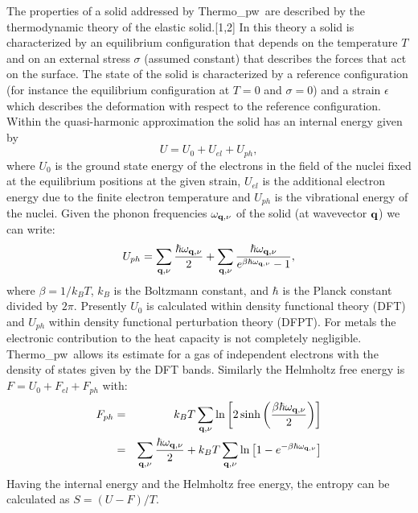 \documentclass[12pt,a4paper,twoside]{report}
\def\tpw{{\sc Thermo}\_{\sc pw}}
\begin{document}
The properties of a solid addressed by \tpw\ are described by the thermodynamic
theory of the elastic solid.[1,2] In this theory a solid is characterized by an
equilibrium configuration that depends on the temperature $T$ and on an
external stress $\sigma$ (assumed constant) that describes the forces 
that act on the surface. The state
of the solid is characterized by a reference configuration 
(for instance the equilibrium configuration at $T=0$ and $\sigma=0$) and 
a strain $\epsilon$ which describes the deformation with respect to the 
reference configuration. 
Within the quasi-harmonic approximation the solid has an internal
energy given by  
\begin{equation}
U=U_0 + U_{el} + U_{ph},
\end{equation}
where $U_0$ is the ground state energy of the electrons in the field 
of the nuclei fixed at the equilibrium positions at the given strain, 
$U_{el}$ is the additional electron energy due to the 
finite electron temperature and $U_{ph}$ is the vibrational energy of the nuclei. 
Given the phonon frequencies $\omega_{{\bf q},\nu}$ of the solid 
(at wavevector ${\bf q}$) we can write:
\begin{equation}
U_{ph} = \sum_{{\bf q},\nu} {\hbar \omega_{{\bf q},\nu} \over 2}
+ \sum_{{\bf q},\nu} {\hbar \omega_{{\bf q},\nu} \over 
e^{\beta \hbar \omega_{{\bf q},\nu}}-1},
\label{uvib}
\end{equation}
where $\beta=1/ k_B T$, $k_B$ is the Boltzmann constant, and $\hbar$ is the
Planck constant divided by $2\pi$.
Presently $U_0$ is calculated within density functional theory (DFT) and
$U_{ph}$ within density functional perturbation theory (DFPT). 
For metals the electronic contribution to the heat capacity is not 
completely negligible. \tpw\ allows its estimate for a gas of 
independent electrons with the density of states given by the DFT bands.
Similarly the Helmholtz free energy is $F=U_0+F_{el}+F_{ph}$ with:
\begin{eqnarray}
F_{ph} &=& k_B T \sum_{{\bf q},\nu} \ln \left[ 2 \sinh \left({\beta \hbar 
\omega_{{\bf q},\nu} \over 2}\right) \right] \nonumber \\
&=& \sum_{{\bf q},\nu} {\hbar \omega_{{\bf q},\nu} \over 2}
+ k_B T \sum_{{\bf q},\nu} \ln \left [ 1-
e^{-\beta \hbar \omega_{{\bf q},\nu}} \right]
\nonumber
\end{eqnarray}
Having the internal energy and the Helmholtz free energy, the entropy can 
be calculated as $S=(U-F)/T$.
\end{document}

